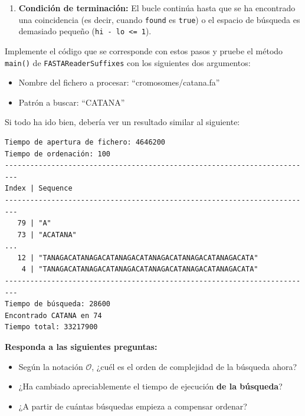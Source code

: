 \documentclass[10pt,a4paper,spanish]{article}
\newcommand{\code}[1]{\texttt{#1}}
\newcommand{\bigO}{\mathcal{O}}
\begin{document}
\begin{enumerate}
\begin{itemize}
\begin{itemize}
        \item Si el carácter del \code{pattern} es lexicográficamente anterior al carácter del sufijo (\code{pattern[index] < content[posSuffix + index]}), se descarta la mitad derecha de \code{suffixes} estableciendo \code{hi = m---}, y se reinicia el contador (\code{index = 0}).
        \item Si el carácter del \code{pattern} es lexicográficamente posterior al carácter del sufijo (\code{pattern[index] >  content[posSuffix + index]}), se descarta la mitad izquierda de \code{suffixes}, estableciendo \code{lo = m++}, y se reinicia el contador (\code{index = 0}).
        \end{itemize}
    \end{itemize}
\item \textbf{Condición de terminación:} El bucle continúa hasta que se ha encontrado una coincidencia (es decir, cuando \code{found} es \code{true}) o el espacio de búsqueda es demasiado pequeño (\code{hi - lo <= 1}).
\end{enumerate}

Implemente el código que se corresponde con estos pasos y pruebe el método \code{main()} de \code{FASTAReaderSuffixes} con los siguientes dos argumentos:

\begin{itemize}
    \item Nombre del fichero a procesar: ``cromosomes/catana.fa''
    \item Patrón a buscar: ``CATANA''
\end{itemize}

Si todo ha ido bien, debería ver un resultado similar al siguiente:

\begin{verbatim}
Tiempo de apertura de fichero: 4646200
Tiempo de ordenación: 100
-------------------------------------------------------------------------
Index | Sequence
-------------------------------------------------------------------------
   79 | "A"
   73 | "ACATANA"
...
   12 | "TANAGACATANAGACATANAGACATANAGACATANAGACATANAGACATA"
    4 | "TANAGACATANAGACATANAGACATANAGACATANAGACATANAGACATA"
-------------------------------------------------------------------------
Tiempo de búsqueda: 28600
Encontrado CATANA en 74
Tiempo total: 33217900
\end{verbatim}

\textbf{Responda a las siguientes preguntas:}

\begin{itemize}
    \item Según la notación $\bigO$, ¿cuél es el orden de complejidad de la búsqueda ahora?
    \item ¿Ha cambiado apreciablemente el tiempo de ejecución \textbf{de la búsqueda}?
    \item ¿A partir de cuántas búsquedas empieza a compensar ordenar?
\end{itemize}
\end{document}
